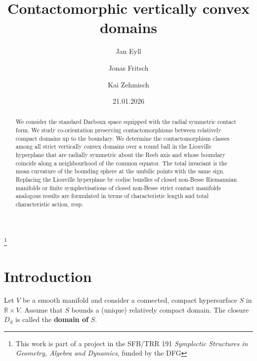 \documentclass{amsart}
\theoremstyle{definition}
\newcommand{\R}{\mathbb R}
\begin{document}
\author{Jan Eyll}
\author{Jonas Fritsch}
\author{Kai Zehmisch}
\address{Fakult\"at f\"ur Mathematik, Ruhr-Universit\"at Bochum,
Universit\"atsstra{\ss}e 150, D-44801 Bochum, Germany}


\title[Contactomorphic vertically convex domains]
{Contactomorphic vertically convex domains}


\date{21.01.2026}

\begin{abstract}
  We consider the standard Darboux space
  equipped with the radial symmetric contact form.
  We study co-orientation preserving contactomorphisms
  between relatively compact domains up to the boundary.
  We determine the contactomorphism classes among all
  strict vertically convex domains
  over a round ball in the Liouville hyperplane
  that are radially symmetric about the Reeb axis
  and whose boundary coincide
  along a neighbourhood of the common equator.
  The total invariant is
  the mean curvature of the bounding sphere
  at the umbilic points with the same sign.
  Replacing the Liouville hyperplane
  by codisc bundles of closed non-Besse
  Riemannian manifolds
  or finite symplectisations of closed
  non-Besse strict contact manifolds
  analogous results are formulated
  in terms of characteristic length
  and total characteristic action, resp.
\end{abstract}


\thanks{This work is part of a project in the SFB/TRR 191
{\it Symplectic Structures in Geometry, Algebra and Dynamics},
funded by the DFG}


\maketitle





\section{Introduction\label{sec:intro}}


Let $V$ be a smooth manifold
and consider a connected, compact hypersurface $S$
in $\R\times V$.
Assume that $S$ bounds a (unique) relatively compact domain.
The closure $D_S$ is called the {\bf domain of} $S$.
\end{document}
